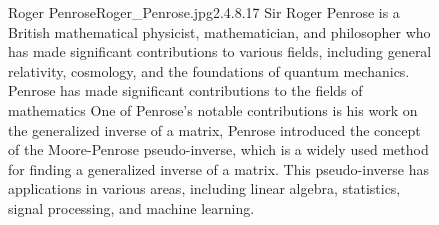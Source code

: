 \begin{figure}[b]
    \begin{enrichment}{Roger Penrose}{Roger_Penrose.jpg}{2.4}{.8}{.17}
        Sir Roger Penrose is a British mathematical physicist, mathematician, and philosopher
        who has made significant contributions to various fields, including general relativity,
        cosmology, and the foundations of quantum mechanics. \\
        Penrose has made significant contributions to the fields of mathematics
        One of Penrose's notable contributions is his work on the generalized inverse of a matrix,
        Penrose introduced the concept of the Moore-Penrose pseudo-inverse,
        which is a widely used method for finding a generalized inverse of a matrix.
        This pseudo-inverse has applications in various areas, including linear algebra,
        statistics, signal processing, and machine learning.
    \end{enrichment}
\end{figure}
